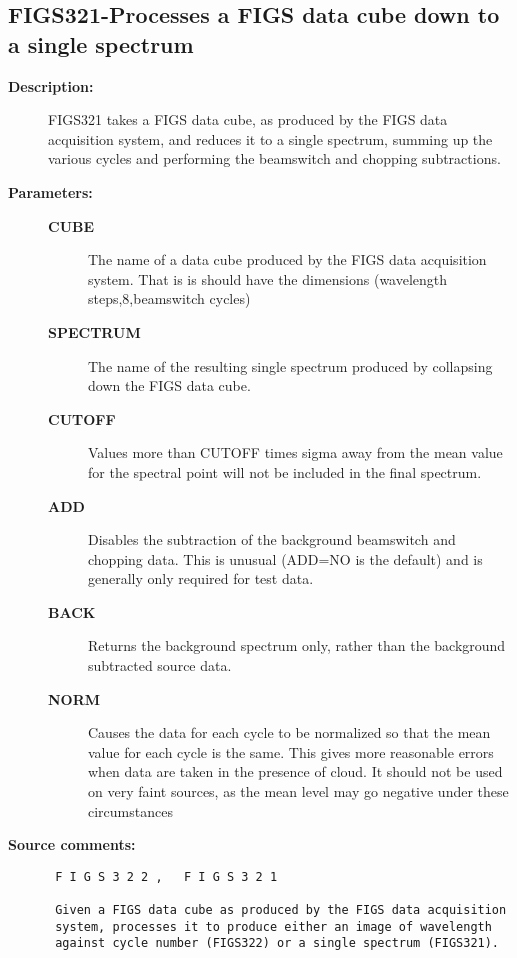 \subsection{FIGS321-\label{FIGS321}Processes a FIGS data cube down to a single spectrum}
\begin{description}

\item [{\bf Description:}]
 FIGS321 takes a FIGS data cube, as produced by the FIGS data
 acquisition system, and reduces it to a single spectrum, summing
 up the various cycles and performing the beamswitch and chopping
 subtractions.

\item [{\bf Parameters:}]
\begin{description}
\item [{\bf CUBE}]
 The name of a data cube produced by the FIGS data
 acquisition system.  That is is should have the
 dimensions (wavelength steps,8,beamswitch cycles)
\item [{\bf SPECTRUM}]
 The name of the resulting single spectrum
 produced by collapsing down the FIGS data cube.
\item [{\bf CUTOFF}]
 Values more than CUTOFF times sigma away from the mean
 value for the spectral point will not be included in
 the final spectrum.
\item [{\bf ADD}]
 Disables the subtraction of the background beamswitch
 and chopping data.  This is unusual (ADD=NO is the
 default) and is generally only required for test data.
\item [{\bf BACK}]
 Returns the background spectrum only, rather than the
 background subtracted source data.
\item [{\bf NORM}]
 Causes the data for each cycle to be normalized so that
 the mean value for each cycle is the same. This gives more
 reasonable errors when data are taken in the presence of
 cloud. It should not be used on very faint sources, as the
 mean level may go negative under these circumstances
\end{description}

\item [{\bf Source comments:}]
\begin{verbatim}
 F I G S 3 2 2 ,   F I G S 3 2 1

 Given a FIGS data cube as produced by the FIGS data acquisition
 system, processes it to produce either an image of wavelength
 against cycle number (FIGS322) or a single spectrum (FIGS321).


\end{verbatim}
\end{description}
